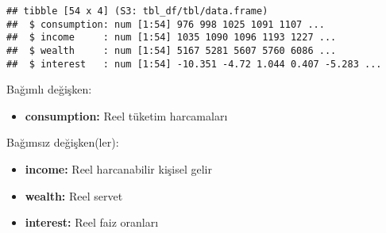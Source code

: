 \documentclass[
]{book}
\newenvironment{Shaded}{\begin{snugshade}}{\end{snugshade}}
\newcommand{\CommentTok}[1]{\textcolor[rgb]{0.56,0.35,0.01}{\textit{#1}}}
\newcommand{\DataTypeTok}[1]{\textcolor[rgb]{0.13,0.29,0.53}{#1}}
\newcommand{\KeywordTok}[1]{\textcolor[rgb]{0.13,0.29,0.53}{\textbf{#1}}}
\newcommand{\NormalTok}[1]{#1}
\newcommand{\OperatorTok}[1]{\textcolor[rgb]{0.81,0.36,0.00}{\textbf{#1}}}
\newcommand{\StringTok}[1]{\textcolor[rgb]{0.31,0.60,0.02}{#1}}
\providecommand{\tightlist}{%
  \setlength{\itemsep}{0pt}\setlength{\parskip}{0pt}}
\begin{document}
\begin{Shaded}
\end{Shaded}

\begin{verbatim}
## tibble [54 x 4] (S3: tbl_df/tbl/data.frame)
##  $ consumption: num [1:54] 976 998 1025 1091 1107 ...
##  $ income     : num [1:54] 1035 1090 1096 1193 1227 ...
##  $ wealth     : num [1:54] 5167 5281 5607 5760 6086 ...
##  $ interest   : num [1:54] -10.351 -4.72 1.044 0.407 -5.283 ...
\end{verbatim}

Bağımlı değişken:

\begin{itemize}
\tightlist
\item
  \textbf{consumption:} Reel tüketim harcamaları
\end{itemize}

Bağımsız değişken(ler):

\begin{itemize}
\item
  \textbf{income:} Reel harcanabilir kişisel gelir
\item
  \textbf{wealth:} Reel servet
\item
  \textbf{interest:} Reel faiz oranları
\end{itemize}

\begin{Shaded}
\end{Shaded}
\end{document}
